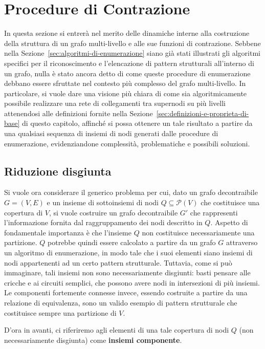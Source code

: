 \section{Procedure di Contrazione}\label{cap:procedure-contrazione}

In questa sezione si entrerà nel merito delle dinamiche interne alla costruzione della struttura di un grafo
multi-livello e alle sue funzioni di contrazione.
Sebbene nella Sezione~\ref{sec:algoritmi-di-enumerazione} siano già stati illustrati gli
algoritmi specifici per il riconoscimento e l'elencazione di pattern strutturali all'interno di un grafo,
nulla è stato ancora detto di come queste procedure di enumerazione debbano essere sfruttate nel contesto più
complesso del grafo multi-livello.
In particolare, si vuole dare una visione più chiara di come sia algoritmicamente
possibile realizzare una rete di collegamenti tra supernodi su più livelli attenendosi alle definizioni
fornite nella Sezione~\ref{sec:definizioni-e-proprieta-di-base} di questo capitolo, affinché si possa ottenere un tale
risultato a partire da una qualsiasi sequenza di insiemi di nodi generati dalle procedure di enumerazione,
evidenziandone complessità, problematiche e possibili soluzioni.

\subsection{Riduzione disgiunta}

Si vuole ora considerare il generico problema per cui, dato un grafo decontraibile $G = (V, E)$ e un insieme di
sottoinsiemi di nodi $Q \subseteq \mathcal{P}(V)$ che costituisce una copertura di $V$, si vuole costruire un grafo
decontraibile $G'$ che rappresenti l'informazione fornita dal raggruppamento dei nodi descritto in $Q$.
Aspetto di fondamentale importanza è che l'insieme $Q$ non costituisce necessariamente una partizione.
$Q$ potrebbe quindi essere calcolato a partire da un grafo $G$ attraverso un algoritmo di enumerazione, in modo tale
che i suoi elementi siano insiemi di nodi appartenenti ad un certo pattern strutturale.
Tuttavia, come si può immaginare, tali insiemi non sono necessariamente disgiunti: basti pensare alle cricche e ai
circuiti semplici, che possono avere nodi in intersezioni di più insiemi.
Le componenti fortemente connesse invece, essendo costruite a partire da una relazione di equivalenza, sono un
valido esempio di pattern strutturale che costituisce sempre una partizione di $V$.

D'ora in avanti, ci riferiremo agli elementi di una tale copertura di nodi $Q$ (non necessariamente disgiunta)
come \textbf{insiemi componente}. \newline

